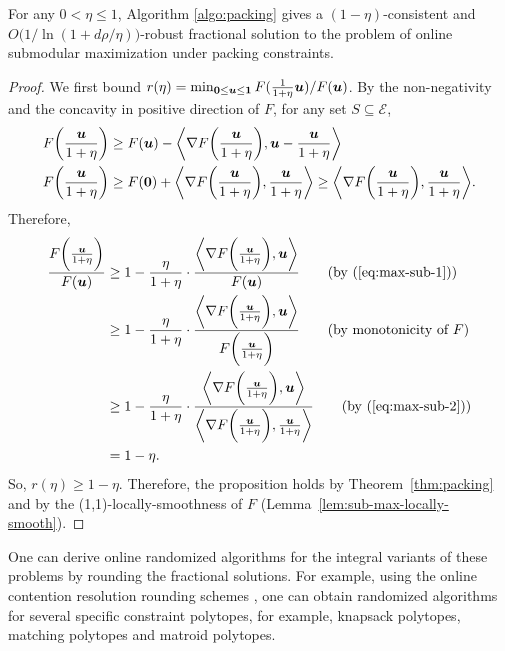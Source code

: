 \begin{proposition}	\label{prop:max-submodular}
For any $0 < \eta \leq 1$, Algorithm \ref{algo:packing} gives a $(1 - \eta)$-consistent
and $O\bigl(1/\ln(1+ d \rho/\eta)\bigr)$-robust fractional solution to
the problem of online submodular maximization under packing constraints.
\end{proposition}
%
\begin{proof}
We first bound $r(\eta) = \min_{\bm{0} \leq \bm{u} \leq \bm{1}} F(\frac{1}{1 + \eta} \bm{u})/F(\bm{u})$. 
By the non-negativity and the concavity in positive direction of $F$, for any set $S \subseteq \mathcal{E}$, 
%
\begin{align}
F\biggl(\frac{\bm{u}}{1 + \eta}  \biggr) 
&\geq F(\bm{u}) - \biggl \langle \nabla F\biggl(\frac{\bm{u}}{1 + \eta} \biggr), \bm{u} - \frac{\bm{u}}{1 + \eta} \biggr \rangle
\label{eq:max-sub-1}
\\
F\biggl(\frac{\bm{u}}{1 + \eta} \biggr) 
 &\geq F(\bm{0}) + \biggl \langle \nabla F\biggl(\frac{\bm{u}}{1 + \eta} \biggr), \frac{\bm{u}}{1 + \eta}\biggr \rangle
 \geq  \biggl \langle \nabla F\biggl(\frac{\bm{u}}{1 + \eta} \biggr), \frac{\bm{u}}{1 + \eta} \biggr \rangle.
\label{eq:max-sub-2}
\end{align}
Therefore,
\begin{align}
\frac{F\biggl(\frac{\vect{u}}{1 + \eta}\biggr)}{F(\vect{u})}
&\geq 1 - \frac{\eta}{1 + \eta} \cdot \frac{\biggl \langle \nabla F\biggl(\frac{\vect{u}}{1 + \eta}\biggr), \vect{u} \biggr \rangle}{F(\vect{u})} 	\tag{by (\ref{eq:max-sub-1})}\\
%
&\geq 
1 - \frac{\eta}{1 + \eta} \cdot \frac{\biggl \langle \nabla F\biggl(\frac{\vect{u}}{1 + \eta}\biggr), \vect{u} \biggr \rangle}{F\biggl(\frac{\vect{u}}{1 + \eta}\biggr)}  	\tag{by monotonicity of $F$}\\
%
&\geq 
1 - \frac{\eta}{1 + \eta} \cdot \frac{\biggl \langle \nabla F\biggl( \frac{\vect{u}}{1 + \eta} \biggr), \vect{u} \biggr \rangle}{\biggl \langle \nabla F\biggl(\frac{\vect{u}}{1 + \eta}\biggr), \frac{\vect{u}}{1 + \eta}\biggr \rangle}
	\tag{by (\ref{eq:max-sub-2})} \\
&= 1 - \eta. 	\notag
\end{align}
So, $r(\eta) \geq 1 - \eta$. Therefore, the proposition holds by Theorem~\ref{thm:packing} and by the (1,1)-locally-smoothness of $F$ (Lemma~\ref{lem:sub-max-locally-smooth}).
\end{proof}

One can derive online randomized algorithms for the integral variants of these problems by rounding the fractional solutions.
For example, using the online contention resolution rounding schemes \cite{FeldmanSvensson16:Online-contention}, 
one can obtain randomized algorithms for several specific constraint polytopes, for example, knapsack polytopes, 
matching polytopes and matroid polytopes. 



